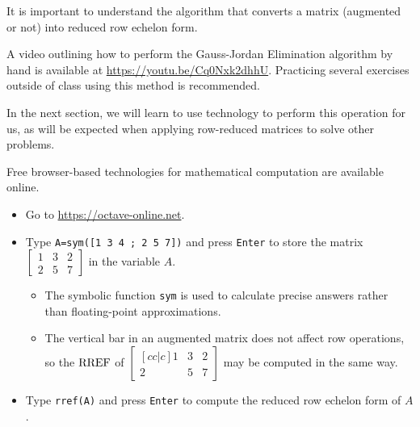 \begin{remark}
It is important to understand the  algorithm
that converts a matrix (augmented or not) into reduced row echelon form.

\vspace{1em}

A video outlining how to perform the Gauss-Jordan Elimination algorithm
by hand is available at \url{https://youtu.be/Cq0Nxk2dhhU}.
Practicing several exercises outside of class using this method is
recommended.

\vspace{1em}

In the next section, we will learn to use technology to perform this
operation for us, as will be expected when applying row-reduced
matrices to solve other problems.
\end{remark}





\begin{activity}{10}
Free browser-based technologies for mathematical computation
are available online.
\begin{itemize}
\item Go to \url{https://octave-online.net}.
\item Type \texttt{A=sym([1 3 4 ; 2 5 7])} and press \texttt{Enter}
      to store the matrix
      \(\begin{bmatrix} 1 & 3 & 2 \\ 2 & 5 & 7 \end{bmatrix}\)
      in the variable \(A\).
  \begin{itemize}
    \item The symbolic function \texttt{sym} is used to calculate precise answers 
          rather than floating-point approximations.
    \item The vertical bar in an augmented matrix does not affect
          row operations, so the \(\operatorname{RREF}\) of
      \(\begin{bmatrix}[cc|c] 1 & 3 & 2 \\ 2 & 5 & 7 \end{bmatrix}\)
          may be computed in the same way.
  \end{itemize}
\item Type \texttt{rref(A)} and press \texttt{Enter}
      to compute the reduced row echelon form of \(A\).
\end{itemize}
\end{activity}

